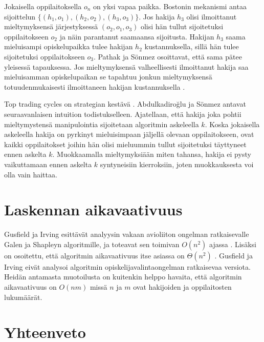 \documentclass[gradu, twoside]{tktltiki}
\begin{document}
Jokaisella oppilaitoksella $o_n$ on yksi vapaa paikka. Bostonin
mekanismi antaa sijoittelun $\{(h_1, o_1), (h_2, o_2), (h_3, o_3)\}$.
Jos hakija $h_3$ olisi ilmoittanut mieltymyksensä järjestyksessä
$(o_2, o_1, o_3)$ olisi hän tullut sijoitetuksi oppilaitokseen $o_2$
ja näin parantanut saamaansa sijoitusta. Hakijan $h_3$ saama
mieluisampi opiskelupaikka tulee hakijan $h_2$ kustannuksella, sillä
hän tulee sijoitetuksi oppilaitokseen $o_3$. Pathak ja Sönmez
osoittavat, että sama pätee yleisessä tapauksessa. Jos mieltymyksensä
valheellisesti ilmoittanut hakija saa mieluisamman opiskelupaikan se
tapahtuu jonkun mieltymyksensä totuudenmukaisesti ilmoittaneen hakijan
kustannuksella \cite{pathak08}.

Top trading cycles on strategian kestävä \cite{abdusön03}.
Abdulkadiroğlu ja Sönmez antavat seuraavanlaisen intuition
todistukselleen. Ajatellaan, että hakija joka pohtii mieltymystensä
manipulointia sijoitetaan algoritmin askeleella $k$. Koska jokaisella
askeleella hakija on pyrkinyt mieluisimpaan jäljellä olevaan
oppilaitokseen, ovat kaikki oppilaitokset joihin hän olisi mieluummin
tullut sijoitetuksi täyttyneet ennen askelta $k$. Muokkaamalla
mieltymyksiään miten tahansa, hakija ei pysty vaikuttamaan ennen
askelta $k$ syntyneisiin kierroksiin, joten muokkauksesta voi olla
vain haittaa.

\section{Laskennan aikavaativuus}

Gusfield ja Irving esittävät analyysin vakaan avioliiton ongelman
ratkaisevalle Galen ja Shapleyn algoritmille, ja toteavat sen toimivan
$O(n^2)$ ajassa \cite{gusfield89}. Lisäksi on osoitettu, että
algoritmin aikavaativuus itse asiassa on $\Theta(n^2)$ \cite{cheng89}.
Gusfield ja Irving eivät analysoi algoritmin opiskelijavalintaongelman
ratkaisevaa versiota. Heidän antamasta muotoilusta on kuitenkin helppo
havaita, että algoritmin aikavaativuus on $O(nm)$ missä $n$ ja $m$
ovat hakijoiden ja oppilaitosten lukumäärät.

\section{Yhteenveto}
\end{document}
